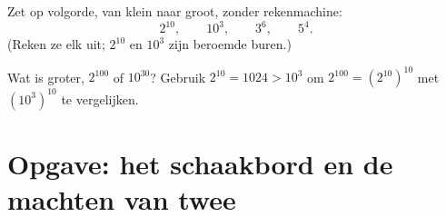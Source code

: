 \begin{exercise}[$\star\star$]\label{exo:g8:powers:10}
Zet op volgorde, van klein naar groot, zonder rekenmachine:
\[
2^{10}, \qquad 10^3, \qquad 3^6, \qquad 5^4 .
\]
(Reken ze elk uit; $2^{10}$ en $10^3$ zijn beroemde buren.)
\end{exercise}

\begin{exercise}[$\star\star\star$]\label{exo:g8:powers:11}
Wat is groter, $2^{100}$ of $10^{30}$? Gebruik $2^{10} = 1024 > 10^3$ om
$2^{100} = \left(2^{10}\right)^{10}$ met $\left(10^3\right)^{10}$ te vergelijken.
\end{exercise}

\section{Opgave: het schaakbord en de machten van twee}

